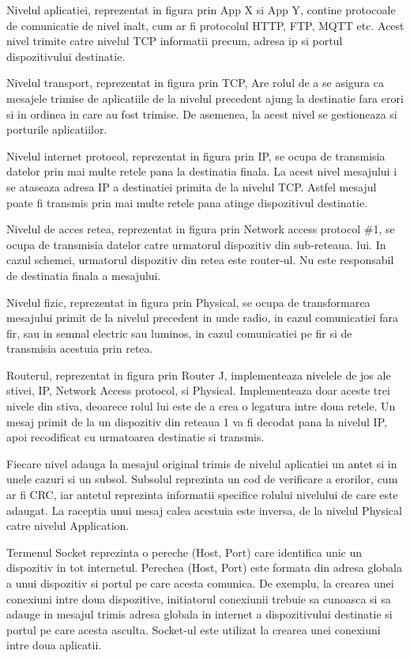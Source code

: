 Nivelul aplicatiei, reprezentat in figura prin App X si App Y, contine protocoale de comunicatie de nivel inalt, cum ar fi protocolul HTTP, FTP, MQTT etc. 
Acest nivel trimite catre nivelul TCP informatii precum, adresa ip si portul dispozitivului destinatie.

Nivelul transport, reprezentat in figura prin TCP, Are rolul de a se asigura ca mesajele trimise de aplicatiile de la nivelul precedent ajung la destinatie 
fara erori si in ordinea in care au fost trimise. De asemenea, la acest nivel se gestioneaza si porturile aplicatiilor. 

Nivelul internet protocol, reprezentat in figura prin IP, se ocupa de transmisia datelor prin mai multe retele pana la destinatia finala. La acest nivel 
mesajului i se ataseaza adresa IP a destinatiei primita de la nivelul TCP. Astfel mesajul poate fi transmis prin mai multe retele pana atinge dispozitivul 
destinatie.

Nivelul de acces retea, reprezentat in figura prin Network access protocol \#1, se ocupa de transmisia datelor catre urmatorul dispozitiv din sub-reteaua.
lui. In cazul schemei, urmatorul dispozitiv din retea este router-ul. Nu este responsabil de destinatia finala a mesajului.

Nivelul fizic, reprezentat in figura prin Physical, se ocupa de transformarea mesajului primit de la nivelul precedent in unde radio, in cazul 
comunicatiei fara fir, sau in semnal electric sau luminos, in cazul comunicatiei pe fir si de transmisia acestuia prin retea. 

Routerul, reprezentat in figura prin Router J, implementeaza nivelele de jos ale stivei, IP, Network Access protocol, si Physical. Implementeaza doar aceste 
trei nivele din stiva, deoarece rolul lui este de a crea o legatura intre doua retele. Un mesaj primit de la un dispozitiv din reteaua 1 va fi decodat pana 
la nivelul IP, apoi recodificat cu urmatoarea destinatie si transmis.

Fiecare nivel adauga la mesajul original trimis de nivelul aplicatiei un antet si in unele cazuri si un subsol. Subsolul reprezinta un cod de verificare a 
erorilor, cum ar fi CRC, iar antetul reprezinta informatii specifice rolului nivelului de care este adaugat. La raceptia unui mesaj calea acestuia este inversa, 
de la nivelul Physical catre nivelul Application.

Termenul Socket reprezinta o pereche (Host, Port) care identifica unic un dispozitiv in tot internetul. Perechea (Host, Port) este formata din adresa globala
a unui dispozitiv si portul pe care acesta comunica. De exemplu, la crearea unei conexiuni intre doua dispozitive, initiatorul conexiunii trebuie sa cunoasca si 
sa adauge in mesajul trimis adresa globala in internet a dispozitivului destinatie si portul pe care acesta asculta. Socket-ul este utilizat la crearea unei 
conexiuni intre doua aplicatii.


